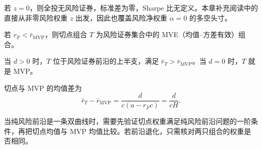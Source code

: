 若 $z=0$，则全投无风险证券，标准差为零，Sharpe 比无定义。本章补充阅读中的直接从非零风险权重 $z$ 出发，因此也覆盖风险净权重 $\alpha=0$ 的多空头寸。

\begin{tcolorbox}[knowledge]
 若 $r_F<\bar r_{\mathrm{MVP}}$，则切点组合 $T$ 为风险证券集合中的 MVE（均值--方差有效）组合。

当 $d>0$ 时，$T$ 位于风险证券前沿的上半支，满足 $\bar r_T>\bar r_{\mathrm{MVP}}$。当 $d=0$ 时，$T$ 就是 MVP。

切点与 MVP 的均值差为
\begin{equation*}
 \bar r_T-\bar r_{\mathrm{MVP}}=\frac{d}{c(a-r_Fc)}=\frac{d}{cH}.
 \tag{12.XIV}\label{eq:wj-12-tangency-mean-gap}
\end{equation*}
\end{tcolorbox}

当纯风险前沿是一条双曲线时，需要先验证切点权重满足纯风险前沿问题的一阶条件，再把切点均值与 MVP 均值比较。若前沿退化，只需核对两只组合的权重是否相同。

